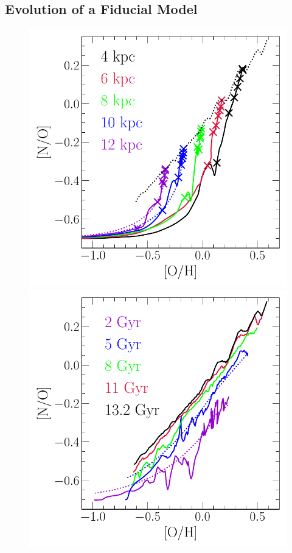 \documentclass[ms.tex]{subfiles}
\begin{document}
\subsection{Evolution of a Fiducial Model}
\label{sec:results:fiducial}

\begin{figure}
\centering
\includegraphics[scale = 0.6]{no_oh_superposition.pdf}
\includegraphics[scale = 0.6]{no_oh_timeevol.pdf}

\end{figure}
\end{document}
